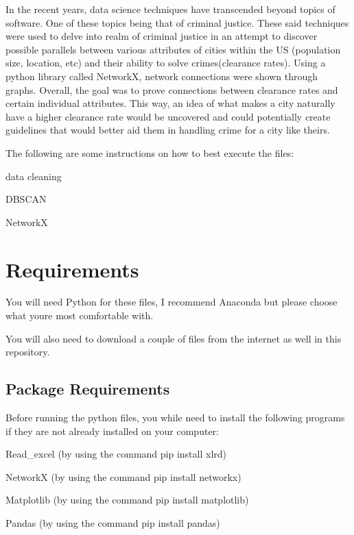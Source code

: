 In the recent years, data science techniques have transcended beyond topics of software. One of these topics being that of criminal justice. These said techniques were used to delve into realm of criminal justice in an attempt to discover possible parallels between various attributes of cities within the U\+S (population size, location, etc) and their ability to solve crimes(clearance rates). Using a python library called Network\+X, network connections were shown through graphs. Overall, the goal was to prove connections between clearance rates and certain individual attributes. This way, an idea of what makes a city naturally have a higher clearance rate would be uncovered and could potentially create guidelines that would better aid them in handling crime for a city like theirs.

The following are some instructions on how to best execute the files\+:
\begin{DoxyItemize}
\item data cleaning
\item D\+B\+S\+C\+A\+N
\item Network\+X
\end{DoxyItemize}

\section*{Requirements}

You will need Python for these files, I recommend Anaconda but please choose what you\textquotesingle{}re most comfortable with.

You will also need to download a couple of files from the internet as well in this repository.

\subsection*{Package Requirements}

Before running the python files, you while need to install the following programs if they are not already installed on your computer\+:


\begin{DoxyItemize}
\item Read\+\_\+excel (by using the command \textquotesingle{}pip install xlrd\textquotesingle{})
\item Network\+X (by using the command \textquotesingle{}pip install networkx\textquotesingle{})
\item Matplotlib (by using the command \textquotesingle{}pip install matplotlib\textquotesingle{})
\item Pandas (by using the command \textquotesingle{}pip install pandas\textquotesingle{})
\end{DoxyItemize}

